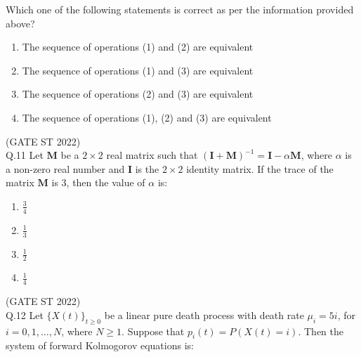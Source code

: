 \documentclass[journal,12pt,onecolumn]{IEEEtran}
\theoremstyle{remark}
\begin{document}
	 Which one of the following statements is correct as per the information provided above?\\[0.5em]
	  \begin{multicols}{2}
	 \begin{enumerate}[label=(\Alph*)]
	 	\item The sequence of operations (1) and (2) are equivalent
	 	\item The sequence of operations (1) and (3) are equivalent
	 	\item The sequence of operations (2) and (3) are equivalent
	 	\item The sequence of operations (1), (2) and (3) are equivalent
	 \end{enumerate}
	\end{multicols}
	 \hfill (GATE ST 2022)
	 \vspace{2em}
	 \\
Q.11 Let $\mathbf{M}$ be a $2 \times 2$ real matrix such that 
$(\mathbf{I} + \mathbf{M})^{-1} = \mathbf{I} - \alpha \mathbf{M}$, 
where $\alpha$ is a non-zero real number and $\mathbf{I}$ is the $2 \times 2$ identity matrix. 
If the trace of the matrix $\mathbf{M}$ is $3$, then the value of $\alpha$ is:
\begin{multicols}{4}
\begin{enumerate}[label=\alph*.] 
	\item $\frac{3}{4}$
	\item $\frac{1}{3}$
	\item $\frac{1}{2}$
	\item $\frac{1}{4}$
	\end{enumerate}
\end{multicols}
\hfill (GATE ST 2022)\\
	\vspace{2em}
Q.12 Let $ \{X(t)\}_{t\geq0} $ be a linear pure death process with death rate $\mu_i = 5i$, for $i = 0, 1, \dots , N$, where $N \geq 1$. Suppose that $p_i(t) = P(X(t) = i)$. Then the system of forward Kolmogorov equations is:\\
\end{document}
